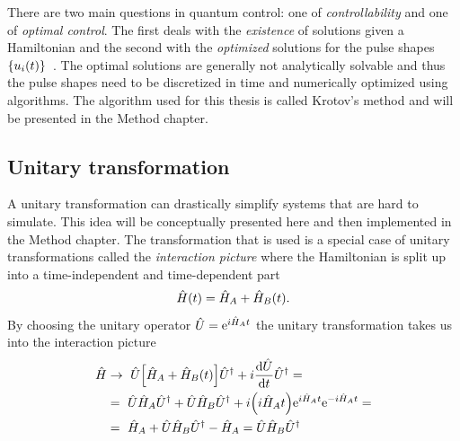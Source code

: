 \documentclass[main.tex]{subfiles}
\begin{document}
There are two main questions in quantum control: one of \emph{controllability} and one of \emph{optimal control}.
The first deals with the \emph{existence} of solutions given a Hamiltonian and the second with the \emph{optimized} solutions for the pulse shapes \(\qty{u_i(t)}\)~\cite{dalessandro_introduction_2007}.
The optimal solutions are generally not analytically solvable and thus the pulse shapes need to be discretized in time and numerically optimized using algorithms.
The algorithm used for this thesis is called Krotov's method and will be presented in the Method chapter.

\subsection{Unitary transformation}
A unitary transformation can drastically simplify systems that are hard to simulate.
This idea will be conceptually presented here and then implemented in the Method chapter.
The transformation that is used is a special case of unitary transformations called the \emph{interaction picture} where the Hamiltonian is split up into a time-independent and time-dependent part
\begin{equation}
    \hat{H}(t) = \hat{H}_A + \hat{H}_B(t).
\end{equation}
By choosing the unitary operator \( \hat{U} = \mathrm{e}^{i \hat{H}_A t} \) the unitary transformation takes us into the interaction picture
\begin{align*}
    \hat{H} &\rightarrow~ \hat{U}\qty[ \hat{H}_A  + \hat{H}_B(t)]\hat{U}^\dagger + i\dv{\hat{U}}{t}\hat{U}^\dagger =\\
    &=~ \hat{U}\hat{H}_A\hat{U}^\dagger + \hat{U}\hat{H}_B\hat{U}^\dagger + i\qty(i\hat{H}_A t)\mathrm{e}^{i \hat{H}_A t}\mathrm{e}^{-i\hat{H}_A t}=\\
    &=~ \hat{H}_A + \hat{U}\hat{H}_B\hat{U}^\dagger - \hat{H}_A = \hat{U}\hat{H}_B\hat{U}^\dagger
\end{align*}
\end{document}
